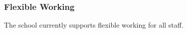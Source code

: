 






\subsubsection{Flexible Working}

The school currently supports flexible working for all staff. 

